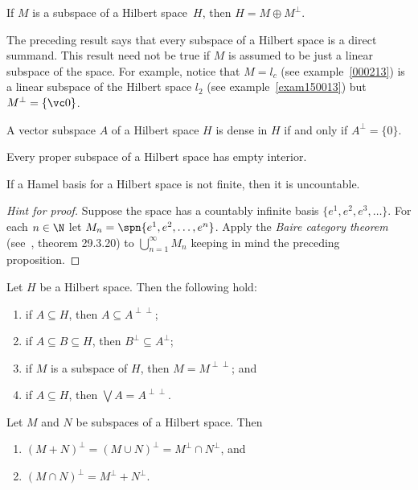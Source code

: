 \begin{cor} If $M$ is a subspace of a Hilbert space~$H$, then $H = M \oplus M^\perp$.
\end{cor}

\begin{exam}The preceding result says that every subspace of a Hilbert space is a direct
summand. This result need not be true if $M$ is assumed to be just a linear subspace of the space.
For example, notice that $M = l_c$ (see example~\ref{000213}) is a linear subspace of the
Hilbert space $l_2$ (see example~\ref{exam150013}) but $M^\perp = \{\vc 0\}$.
\end{exam}

\begin{cor} A vector subspace $A$ of a Hilbert space $H$ is dense in $H$ if and only if $A^\perp = \{0\}$.
\end{cor}

\begin{prop} Every proper subspace of a Hilbert space has empty interior.
\end{prop}

\begin{prop} If a Hamel basis for a Hilbert space is not finite, then it is uncountable.
\end{prop}

\begin{proof}[\emph{Hint for proof}] Suppose the space has a countably infinite basis $\{e^1, e^2, e^3, \dots \}$.
For each $n \in \N$ let $M_n = \spn\{e^1, e^2, \dots, e^n\}$.  Apply the \emph{Baire category theorem} (see~\cite{Erdman:2007},
theorem 29.3.20) to $\bigcup_{n=1}^\infty M_n$ keeping in mind the preceding proposition.   \ns
\end{proof}

\begin{prop}\label{00023} Let $H$ be a Hilbert space. Then the following hold:
 \begin{enumerate}
  \item if $A \subseteq H$, then $A \subseteq A^{\perp\perp}$;
  \item if $A \subseteq B \subseteq H$, then $B^\perp \subseteq A^\perp$;
  \item if $M$ is a subspace of $H$, then $M = M^{\perp\perp}$; and
  \item if $A \subseteq H$, then $\bigvee A = A^{\perp\perp}$.
 \end{enumerate}
\end{prop}

\begin{prop} Let $M$ and $N$ be subspaces of a Hilbert space.  Then
 \begin{enumerate}
  \item  $(M + N)^\perp = (M \cup N)^\perp =  M^\perp \cap N^\perp$, and
  \item  $(M \cap N)^\perp = M^\perp + N^\perp$.
 \end{enumerate}
\end{prop}

